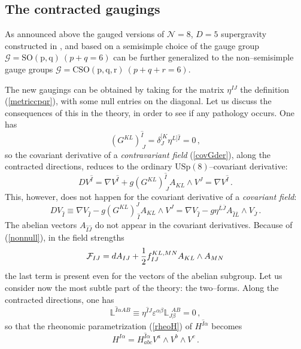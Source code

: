 \documentclass[a4paper,12pt]{article}
\def\bar{\overline}\end {picture}}
\begin{document}
\subsection{The contracted gaugings}
As announced above the gauged versions of $\mathcal{N}=8$, $D=5$
supergravity constructed in \cite{gunwar}, \cite{PPV} and based on
a semisimple choice of the gauge group
$\mathcal{G}=\mathrm{SO(p,q)}~(p\!+\!q\!=\!6)$ can be further
generalized to the non--semisimple gauge groups
$\mathcal{G}=\mathrm{CSO}\mathrm{(p,q,r)}~(p\!+\!q\!+\!r\!=\!6)$.
\par
The new gaugings can be obtained by taking for the matrix
$\eta^{IJ}$ the definition (\ref{metriccpqr}), with some null
entries on the diagonal. Let us discuss the consequences of  this
in the theory, in order to see if any pathology occurs. One has
\begin{equation}
(G^{KL})^{\hat{I}}_{~J}=\delta^{[K}_J\eta^{L]\hat{I}}=0\,,
\end{equation}
so the covariant derivative of a {\sl contravariant field}
(\ref{covGder}), along the contracted directions, reduces to the
ordinary  $\mathrm{USp(8)}$--covariant derivative:
\begin{equation}
DV^{\hat{I}}= \nabla
V^{\hat{I}}+g(G^{KL})^{\hat{I}}_{~J}A_{KL}\wedge V^J =\nabla
V^{\hat{I}}\,.
\end{equation}
This, however, does not happen for the covariant derivative of a
{\sl covariant field}:
\begin{equation}
DV_{\hat{I}} \equiv \nabla
V_{\hat{I}}-g(G^{KL})^J_{~\hat{I}}A_{KL}\wedge V^J= \nabla
V_{\hat{I}}-g\eta^{\bar{L}\bar{J}}A_{\hat{I}\bar{L}}\wedge
V_{\bar{J}}\,.
\end{equation}
The abelian vectors $A_{\hat{I}\hat{J}}$ do not appear in the
covariant derivatives. Because of (\ref{nonnull}), in the field
strengths
\begin{equation}
\mathcal{F}_{IJ}=dA_{IJ}+{1\over 2}f^{KL,MN}_{IJ}A_{KL}\wedge
A_{MN}
\end{equation}
the last term is present even for the vectors of the abelian
subgroup. Let us consider now the most subtle part of the theory:
the two--forms. Along the contracted directions, one has
\begin{equation}
\mathbb{L}^{\hat{I}\alpha AB}\equiv
\eta^{\hat{I}J}\varepsilon^{\alpha\beta}\mathbb{L}_{J\beta}^{~~AB}=0\,,
\end{equation}
so that the rheonomic parametrization (\ref{rheoH}) of
$H^{\hat{I}\alpha}$ becomes
\begin{equation}
H^{\hat{I}\alpha}=H^{\hat{I}\alpha}_{abc}V^a\wedge V^b\wedge
V^c\,. \label{rheoHcontr}
\end{equation}
\end{document}
